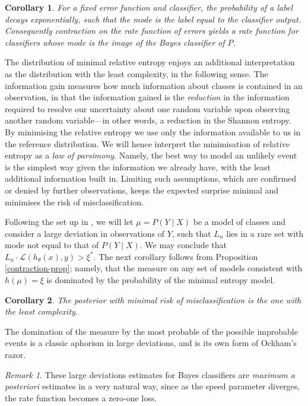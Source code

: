 \documentclass[11pt]{amsart}
\numberwithin{equation}{section}
\newtheorem{corollary}{Corollary}[section]
\theoremstyle{remark}
\newtheorem{remark}{Remark}[section]
\theoremstyle{remark}
\newcommand{\lag}{\mathcal{L}}
\begin{document}
\begin{corollary}\label{exp-cor}
    For a fixed error function and classifier, the probability of a label decays exponentially, such that the mode is the label equal to the classifier output. Consequently contraction on the rate function of errors yields a rate function for classifiers whose mode is the image of the Bayes classifier of $P$.
\end{corollary}

The distribution of minimal relative entropy enjoys an additional interpretation as the distribution with the least complexity, in the following sense. The information gain measures how much information about classes is contained in an observation, in that the information gained is the {\it reduction} in the information required to resolve our uncertainty about one random variable upon observing another random variable---in other words, a reduction in the Shannon entropy. By minimising the relative entropy we use only the information available to us in the reference distribution. We will hence interpret the minimisation of relative entropy as a {\it law of parsimony}. Namely, the best way to model an unlikely event is the simplest way given the information we already have, with the least additional information built in. Limiting such assumptions, which are confirmed or denied by further observations, keeps the expected surprise minimal and minimises the risk of misclassification. 

Following the set up in \cite{jaynes1988relation}, we will let $\mu = P(Y \mid X)$ be a model of classes and consider a large deviation in observations of $Y$, such that $L_n$ lies in a rare set with mode not equal to that of $P(Y \mid X)$. We may conclude that $L_n \cdot \lag(h_\theta(x), y) > \xi^*$. The next corollary follows from Proposition \ref{contraction-prop}; namely, that the measure on any set of models consistent with $h(\mu) = \xi$ is dominated by the probability of the minimal entropy model.

\begin{corollary}\label{models-cor}
    The posterior with minimal risk of misclassification is the one with the least complexity.
\end{corollary}

The domination of the measure by the most probable of the possible improbable events is a classic aphorism in large deviations, and is its own form of Ockham's razor. 

\begin{remark}
These large deviations estimates for Bayes classifiers are {\it maximum a posteriori} estimates in a very natural way, since as the speed parameter diverges, the rate function becomes a zero-one loss.
\end{remark}
\end{document}
